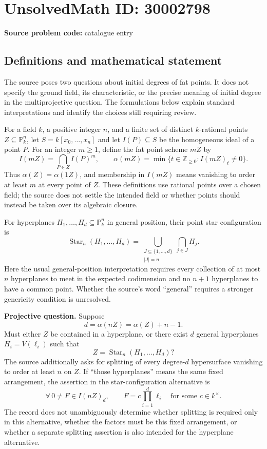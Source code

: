 \documentclass[11pt]{article}
\newcommand{\Z}{\mathbb{Z}}
\newcommand{\PP}{\mathbb{P}}
\begin{document}
\section*{UnsolvedMath ID: 30002798}
\textbf{Source problem code:} catalogue entry
\subsection{Definitions and mathematical statement}
The source poses two questions about initial degrees of fat points. It does not specify the ground field, its characteristic, or the precise meaning of initial degree in the multiprojective question. The formulations below explain standard interpretations and identify the choices still requiring review.

For a field \(k\), a positive integer \(n\), and a finite set of distinct \(k\)-rational points \(Z\subseteq\PP^n_k\), let \(S=k[x_0,\ldots,x_n]\) and let \(I(P)\subseteq S\) be the homogeneous ideal of a point \(P\). For an integer \(m\geq1\), define the fat point scheme \(mZ\) by
\[
 I(mZ)=\bigcap_{P\in Z}I(P)^m,
 \qquad
 \alpha(mZ)=\min\{t\in\Z_{\geq0}:I(mZ)_t\neq0\}.
\]
Thus \(\alpha(Z)=\alpha(1Z)\), and membership in \(I(mZ)\) means vanishing to order at least \(m\) at every point of \(Z\). These definitions use rational points over a chosen field; the source does not settle the intended field or whether points should instead be taken over its algebraic closure.

For hyperplanes \(H_1,\ldots,H_d\subseteq\PP^n_k\) in general position, their point star configuration is
\[
 \operatorname{Star}_n(H_1,\ldots,H_d)
 =\bigcup_{\substack{J\subseteq\{1,\ldots,d\}\\|J|=n}}
 \bigcap_{j\in J}H_j.
\]
Here the usual general-position interpretation requires every collection of at most \(n\) hyperplanes to meet in the expected codimension and no \(n+1\) hyperplanes to have a common point. Whether the source's word ``general'' requires a stronger genericity condition is unresolved.

\textbf{Projective question.} Suppose
\[
 d=\alpha(nZ)=\alpha(Z)+n-1.
\]
Must either \(Z\) be contained in a hyperplane, or there exist \(d\) general hyperplanes \(H_i=V(\ell_i)\) such that
\[
 Z=\operatorname{Star}_n(H_1,\ldots,H_d)?
\]
The source additionally asks for splitting of every degree-\(d\) hypersurface vanishing to order at least \(n\) on \(Z\). If ``those hyperplanes'' means the same fixed arrangement, the assertion in the star-configuration alternative is
\[
 \forall\,0\neq F\in I(nZ)_d,\qquad
 F=c\prod_{i=1}^{d}\ell_i
 \quad\text{for some }c\in k^\times.
\]
The record does not unambiguously determine whether splitting is required only in this alternative, whether the factors must be this fixed arrangement, or whether a separate splitting assertion is also intended for the hyperplane alternative.
\end{document}

